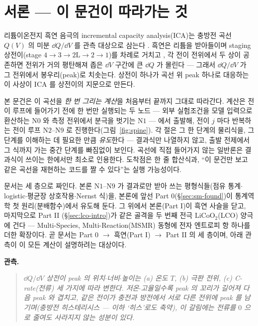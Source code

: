 \section*{서론 --- 이 문건이 따라가는 것}

리튬이온전지 흑연 음극의 incremental capacity analysis(ICA)는 충방전 곡선 $Q(V)$ 의 미분
$\dd Q/\dd V$ 를 관측 대상으로 삼는다 \cite{bloom2005,dubarry2012}. 흑연은 리튬을 받아들이며 staging
상전이(stage $4\!\to\!3\!\to\!2\mathrm L\!\to\!2\!\to\!1$)를 차례로 거치고 \cite{dahn1991,ohzuku1993}, 각 전이
전위에서 두 상이 공존하면 전위가 거의 평탄해져 좁은 $\dd V$ 구간에 큰 $\dd Q$ 가 몰린다 --- 그래서
$\dd Q/\dd V$ 가 그 전위에서 봉우리(peak)로 치솟는다. 상전이 하나가 곡선 위 peak 하나로 대응하는 이
사상이 ICA 를 상전이의 지문으로 만든다.

본 문건은 이 곡선을 \emph{한 번 그리는 계산}을 처음부터 끝까지 그대로 따라간다. 계산은 전이 루프에 들어가기 전에
한 번만 실행되는 두 노드 --- 외부 실험조건을 모델 입력으로 환산하는 $\mathrm N0$ 와 측정 전위에서 분극을 벗기는
$\mathrm N1$ --- 에서 출발해, 전이 $j$ 마다 반복하는 전이 루프 $\mathrm N2$--$\mathrm N9$ 로 진행한다(그림~\ref{fig:spine}). 각 절은 그 한 단계의 물리식을, 그 단계를
이해하는 데 필요한 만큼 \emph{유도}한다 --- 결과식만 나열하지 않고, 출발 전제에서 그 식까지 가는 중간
단계를 빠짐없이 보인다. 곡선에 직접 들어가지 않는 일반론은 결과식이 쓰이는 한에서만 최소로 인용한다.
도착점은 한 줄 합산식과, ``이 문건만 보고 같은 곡선을 재현하는 코드를 짤 수 있다''는 실행 가능성이다.

문서는 세 층으로 짜인다. 본론 $\mathrm N1$--$\mathrm N9$ 가 결과로만 받아 쓰는 평형식들(점유 통계$\cdot$
logistic$\cdot$평균장 상호작용$\cdot$Nernst 식)을, 본론에 앞선 Part 0(\S\ref{sec:sm-found})이 통계역학 첫
원리(분배함수)에서 유도해 둔다. 그 위에서 본론(Part I)이 흑연 사슬을 닫고, 마지막으로 Part II
(\S\ref{sec:lco-intro})가 같은 골격을 두 번째 전극 $\mathrm{LiCoO_2}$(LCO) 양극에 건다 --- Multi-Species,
Multi-Reaction(MSMR) 동형에 전자 엔트로피 항 하나를 더한 확장이다. 곧 문서는 Part 0 $\to$ 흑연(Part I)
$\to$ Part II 의 세 층이며, 아래 관측이 이 모든 계산이 설명하려는 대상이다.

\textbf{관측.}
\begin{quote}\itshape
$\dd Q/\dd V$ 상전이 peak 의 위치$\cdot$너비$\cdot$높이는 (a) 온도 $T$, (b) 극판 전위, (c) C-rate(전류)
세 가지에 따라 변한다. 저온$\cdot$고율일수록 peak 의 꼬리가 길어져 다음 peak 와 겹치고, 같은 전이가 충전과 방전에서
서로 다른 전위에 peak 를 남기며(충방전 히스테리시스 --- 이하 `히스'로도 축약), 이 갈림에는 전류를 $0$ 으로 줄여도 사라지지 않는 성분이 있다.
\end{quote}

